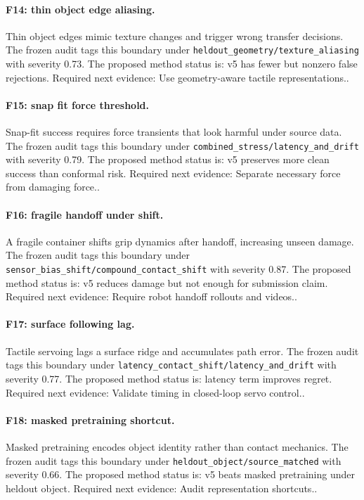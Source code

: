 \documentclass{article}
\begin{document}
\paragraph{F14: thin object edge aliasing.} Thin object edges mimic texture changes and trigger wrong transfer decisions. The frozen audit tags this boundary under \texttt{heldout\_geometry/texture\_aliasing} with severity 0.73. The proposed method status is: v5 has fewer but nonzero false rejections. Required next evidence: Use geometry-aware tactile representations..

\paragraph{F15: snap fit force threshold.} Snap-fit success requires force transients that look harmful under source data. The frozen audit tags this boundary under \texttt{combined\_stress/latency\_and\_drift} with severity 0.79. The proposed method status is: v5 preserves more clean success than conformal risk. Required next evidence: Separate necessary force from damaging force..

\paragraph{F16: fragile handoff under shift.} A fragile container shifts grip dynamics after handoff, increasing unseen damage. The frozen audit tags this boundary under \texttt{sensor\_bias\_shift/compound\_contact\_shift} with severity 0.87. The proposed method status is: v5 reduces damage but not enough for submission claim. Required next evidence: Require robot handoff rollouts and videos..

\paragraph{F17: surface following lag.} Tactile servoing lags a surface ridge and accumulates path error. The frozen audit tags this boundary under \texttt{latency\_contact\_shift/latency\_and\_drift} with severity 0.77. The proposed method status is: latency term improves regret. Required next evidence: Validate timing in closed-loop servo control..

\paragraph{F18: masked pretraining shortcut.} Masked pretraining encodes object identity rather than contact mechanics. The frozen audit tags this boundary under \texttt{heldout\_object/source\_matched} with severity 0.66. The proposed method status is: v5 beats masked pretraining under heldout object. Required next evidence: Audit representation shortcuts..
\end{document}
